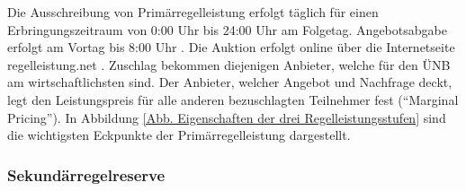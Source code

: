 			
			Die Ausschreibung von Primärregelleistung erfolgt täglich für einen Erbringungszeitraum von 0:00 Uhr bis 24:00 Uhr am Folgetag.
			Angebotsabgabe erfolgt am Vortag bis 8:00 Uhr  \cite{regelleistungnet_PRL_Ausschreibung}.
			Die Auktion erfolgt online über die Internetseite regelleistung.net \cite{regelleistungnet_PRL_Ausschreibung}.
			Zuschlag bekommen diejenigen Anbieter, welche für den ÜNB am wirtschaftlichsten sind.
			Der Anbieter, welcher Angebot und Nachfrage deckt, legt den Leistungspreis für alle anderen bezuschlagten Teilnehmer fest ("`Marginal Pricing"').
			In Abbildung \ref{Abb. Eigenschaften der drei Regelleistungsstufen} sind die wichtigsten Eckpunkte der Primärregelleistung dargestellt.		

		\subsubsection{Sekundärregelreserve}		
			

